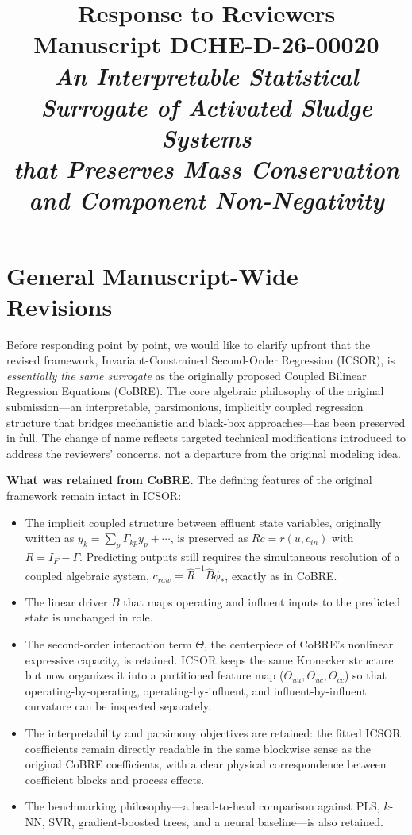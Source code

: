 \documentclass[a4paper,11pt]{article}
\title{Response to Reviewers\\[6pt]
\large Manuscript DCHE-D-26-00020\\[4pt]
\normalsize\textit{An Interpretable Statistical Surrogate of Activated Sludge Systems\\ that Preserves Mass Conservation and Component Non-Negativity}}
\author{}
\date{}
\begin{document}
\maketitle
\thispagestyle{empty}

\section*{General Manuscript-Wide Revisions}

Before responding point by point, we would like to clarify upfront that the revised framework, Invariant-Constrained Second-Order Regression (ICSOR), is \emph{essentially the same surrogate} as the originally proposed Coupled Bilinear Regression Equations (CoBRE). The core algebraic philosophy of the original submission---an interpretable, parsimonious, implicitly coupled regression structure that bridges mechanistic and black-box approaches---has been preserved in full. The change of name reflects targeted technical modifications introduced to address the reviewers' concerns, not a departure from the original modeling idea.

\textbf{What was retained from CoBRE.} The defining features of the original framework remain intact in ICSOR:
\begin{itemize}[nosep]
\item The implicit coupled structure between effluent state variables, originally written as $y_k = \sum_p \Gamma_{kp} y_p + \cdots$, is preserved as $Rc = r(u, c_{in})$ with $R = I_F - \Gamma$. Predicting outputs still requires the simultaneous resolution of a coupled algebraic system, $c_{raw} = \widehat{R}^{-1}\widehat{B}\phi_*$, exactly as in CoBRE.
\item The linear driver $B$ that maps operating and influent inputs to the predicted state is unchanged in role.
\item The second-order interaction term $\Theta$, the centerpiece of CoBRE's nonlinear expressive capacity, is retained. ICSOR keeps the same Kronecker structure but now organizes it into a partitioned feature map ($\Theta_{uu}, \Theta_{uc}, \Theta_{cc}$) so that operating-by-operating, operating-by-influent, and influent-by-influent curvature can be inspected separately.
\item The interpretability and parsimony objectives are retained: the fitted ICSOR coefficients remain directly readable in the same blockwise sense as the original CoBRE coefficients, with a clear physical correspondence between coefficient blocks and process effects.
\item The benchmarking philosophy---a head-to-head comparison against PLS, $k$-NN, SVR, gradient-boosted trees, and a neural baseline---is also retained.
\end{itemize}
\end{document}
